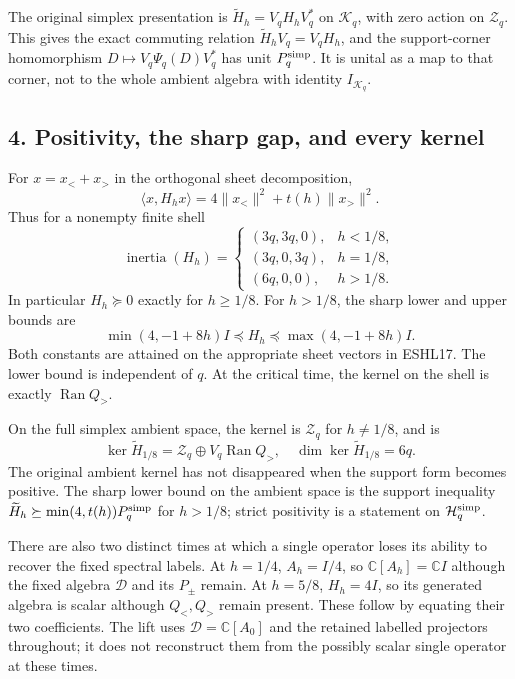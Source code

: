 \documentclass[
  10pt,
  a4paper,
]{article}
\newcounter{none} %
\begin{document}
The original simplex presentation is \(\widetilde H_h=V_qH_hV_q^*\) on
\(\mathcal K_q\), with zero action on \(\mathcal Z_q\). This gives the
exact commuting relation \(\widetilde H_hV_q=V_qH_h\), and the
support-corner homomorphism \(D\mapsto V_q\Psi_q(D)V_q^*\) has unit
\(P_q^{\rm simp}\). It is unital as a map to that corner, not to the
whole ambient algebra with identity \(I_{\mathcal K_q}\).

\subsection{4. Positivity, the sharp gap, and every
kernel}\label{positivity-the-sharp-gap-and-every-kernel}

For \(x=x_<+x_>\) in the orthogonal sheet decomposition, \[
\langle x,H_hx\rangle=4\|x_<\|^2+t(h)\|x_>\|^2.
\tag{ESHL17}
\] Thus for a nonempty finite shell \[
\operatorname{inertia}(H_h)=
\begin{cases}
(3q,3q,0),&h<1/8,\\
(3q,0,3q),&h=1/8,\\
(6q,0,0),&h>1/8.
\end{cases}
\tag{ESHL18}
\] In particular \(H_h\succeq0\) exactly for \(h\ge1/8\). For \(h>1/8\),
the sharp lower and upper bounds are \[
\boxed{\min(4,-1+8h)I\preceq H_h
\preceq\max(4,-1+8h)I.}
\tag{ESHL19}
\] Both constants are attained on the appropriate sheet vectors in
ESHL17. The lower bound is independent of \(q\). At the critical time,
the kernel on the shell is exactly \(\operatorname{Ran}Q_>\).

On the full simplex ambient space, the kernel is \(\mathcal Z_q\) for
\(h\ne1/8\), and is \[
\ker\widetilde H_{1/8}=\mathcal Z_q\oplus V_q\operatorname{Ran}Q_>,
\quad\dim\ker\widetilde H_{1/8}=6q.
\tag{ESHL20}
\] The original ambient kernel has not disappeared when the support form
becomes positive. The sharp lower bound on the ambient space is the
support inequality \(\widetilde H_h\succeq\min(4,t(h))P_q^{\rm simp}\)
for \(h>1/8\); strict positivity is a statement on
\(\mathcal H_q^{\rm simp}\).

There are also two distinct times at which a single operator loses its
ability to recover the fixed spectral labels. At \(h=1/4\), \(A_h=I/4\),
so \(\mathbb C[A_h]=\mathbb CI\) although the fixed algebra
\(\mathcal D\) and its \(P_\pm\) remain. At \(h=5/8\), \(H_h=4I\), so
its generated algebra is scalar although \(Q_<,Q_>\) remain present.
These follow by equating their two coefficients. The lift uses
\(\mathcal D=\mathbb C[A_0]\) and the retained labelled projectors
throughout; it does not reconstruct them from the possibly scalar single
operator at these times.
\end{document}
